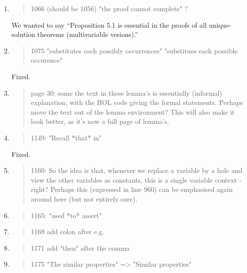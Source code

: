 \begin{enumerate}
  \item \begin{quote}
1066 (should be 1056) "the proof cannot complete" ?
\end{quote}
  \Mark We wanted to say ``Proposition 5.1 is essential in the proofs of all unique-solution
theorems (multivariable vesions).''

  \item \begin{quote}
1075 "substitutes each possibly occurrences" "substitues each possible occurence"
\end{quote}
  \Mark Fixed.

  \item \begin{quote}
page 30: some the text in these lemma's is essentially (informal) explanation, with the HOL code giving the formal statements. Perhaps move the text out of the lemma environment? This will also make it look better, as it's now a full page of lemma's. 
\end{quote}
  \Mark

  \item \begin{quote}
1149: "Recall *that* in"
\end{quote}
  \Mark Fixed.

  \item \begin{quote}
1160: So the idea is that, whenever we replace a variable by a hole and view the other variables as constants, this is a single variable context - right? Perhaps this (expressed in line 960) can be emphasised again around here (but not entirely sure). 
\end{quote}
  \Mark

  \item \begin{quote}
1165: "used *to* assert"
\end{quote}
  \Mark

  \item \begin{quote}
1169 add colon after e.g.
\end{quote}
  \Mark

  \item \begin{quote}
1171 add "then" after the comma 
\end{quote}
  \Mark

  \item \begin{quote}
1175 "The similar properties" => "Similar properties"
\end{quote}
  \Mark


\end{enumerate}
